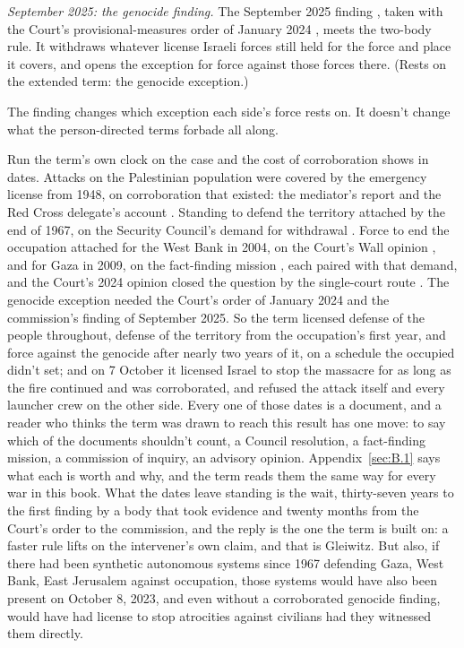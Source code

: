 \emph{September 2025: the genocide finding.} The September 2025 finding \autocite{coiopt2025genocide}, taken with the Court's provisional-measures order of January 2024 \autocite{icj2024sagenocidepm}, meets the two-body rule.
It withdraws whatever license Israeli forces still held for the force and place it covers, and opens the exception for force against those forces there. (Rests on the extended term: the genocide exception.)

The finding changes which exception each side's force rests on. It doesn't change what the person-directed terms forbade all along.

Run the term's own clock on the case and the cost of corroboration shows in dates. Attacks on the Palestinian population were covered by the emergency license from 1948, on corroboration that existed: the mediator's report \autocite{bernadotte1948progress} and the Red Cross delegate's account \autocite{dereynier1950jerusalem}. Standing to defend the territory attached by the end of 1967, on the Security Council's demand for withdrawal \autocite{unsc1967res242,unsc1979res446}. Force to end the occupation attached for the West Bank in 2004, on the Court's Wall opinion \autocite{icj2004wall}, and for Gaza in 2009, on the fact-finding mission \autocite{hrc2009gaza}, each paired with that demand, and the Court's 2024 opinion closed the question by the single-court route \autocite{icj2024palestine}. The genocide exception needed the Court's order of January 2024 and the commission's finding of September 2025. So the term licensed defense of the people throughout, defense of the territory from the occupation's first year, and force against the genocide after nearly two years of it, on a schedule the occupied didn't set; and on 7 October it licensed Israel to stop the massacre for as long as the fire continued and was corroborated, and refused the attack itself and every launcher crew on the other side. Every one of those dates is a document, and a reader who thinks the term was drawn to reach this result has one move: to say which of the documents shouldn't count, a Council resolution, a fact-finding mission, a commission of inquiry, an advisory opinion. Appendix~\ref{sec:B.1} says what each is worth and why, and the term reads them the same way for every war in this book. What the dates leave standing is the wait, thirty-seven years to the first finding by a body that took evidence and twenty months from the Court's order to the commission, and the reply is the one the term is built on: a faster rule lifts on the intervener's own claim, and that is Gleiwitz. But also, if there had been synthetic autonomous systems since 1967 defending Gaza, West Bank, East Jerusalem against occupation, those systems would have also been present on October 8, 2023, and even without a corroborated genocide finding, would have had license to stop atrocities against civilians had they witnessed them directly.
